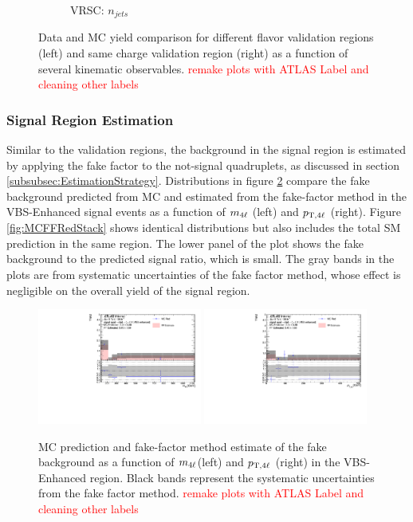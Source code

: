 \begin{figure}[htb]
\begin{subfigure}{.48\textwidth}
        \caption{VRSC: $n_{jets}$}
    \end{subfigure}
        \caption{ Data and MC yield comparison for different flavor validation regions (left) and same charge validation region (right) as a function of several kinematic observables. \textcolor{red}{remake plots with ATLAS Label and cleaning other labels} \label{fig:AllDataMCYield}}
\end{figure}

\subsubsection{Signal Region Estimation}
\label{subsubsec:SREstimation}
Similar to the validation regions, the background in the signal region is estimated by applying the fake factor to the not-signal quadruplets, as discussed in section \ref{subsubsec:EstimationStrategy}. Distributions in figure \ref{fig:MCFFRedComparison} compare the fake background predicted from MC and estimated from the fake-factor method in the VBS-Enhanced signal events as a function of $m_{4\ell}$ (left) and $p_{\textrm{T} ,4\ell}$ (right). Figure \ref{fig:MCFFRedStack} shows identical distributions but also includes the total SM prediction in the same region. The lower panel of the plot shows the fake background to the predicted signal ratio, which is small. The gray bands in the plots are from systematic uncertainties of the fake factor method, whose effect is negligible on the overall yield of the signal region.

\begin{figure}[htb]
    \centering
    \includegraphics[width=0.48\textwidth]{figures/Analysis/Background/MCRedCompare_VBS_Enhanced_M4l.pdf}
    \includegraphics[width=0.48\textwidth]{figures/Analysis/Background/MCRedCompare_VBS_Enhanced_Pt4l.pdf}
    \caption{ MC prediction and fake-factor method estimate of the fake background as a function of $m_{4\ell}$(left) and $p_{\textrm{T} ,4\ell}$ (right) in the VBS-Enhanced region. Black bands represent the systematic uncertainties from the fake factor method. \textcolor{red}{remake plots with ATLAS Label and cleaning other labels} \label{fig:MCFFRedComparison}}
\end{figure}

